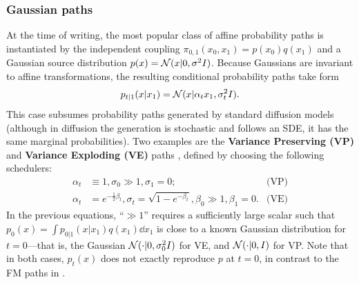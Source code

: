 \documentclass{fairmeta}
\newcommand{\highlight}[1]{{\color{metablue} \textbf{#1}}}
\renewcommand{\eqref}[1]{\labelcref{#1}}
\numberwithin{equation}{section}
\begin{document}
\subsubsection{Gaussian paths} 
\label{subsubsec:gaussian_paths}
At the time of writing, the most popular class of affine probability paths is instantiated by the independent coupling $\pi_{0,1}(x_0,x_1)=p(x_0)q(x_1)$ and a Gaussian source distribution $p(x) = {\mathcal{N}}(x|0, \sigma^2 I)$.
Because Gaussians are invariant to affine transformations, the resulting conditional probability paths take form 
\begin{equation}\label{e:p_t_kernel_gaussian}
    p_{t|1}(x|x_1) = {\mathcal{N}}(x \vert \alpha_t x_1, \sigma_t^2 I).
\end{equation}
This case subsumes probability paths generated by standard diffusion models (although in diffusion the generation is stochastic and follows an SDE, it has the same marginal probabilities).
Two examples are the \highlight{Variance Preserving (VP)} and \highlight{Variance Exploding (VE)} paths \citep{song2021sde}, defined by choosing the following schedulers: 
\begin{align*}
  \alpha_t &\equiv 1, \sigma_0\gg 1, \sigma_1=0; & \text{(VP)}\\ %
  \alpha_t &= e^{-\frac{1}{2}\beta_t}, \sigma_t = \sqrt{1-e^{-\beta_t}}, \beta_0\gg 1, \beta_1=0. & \text{(VE)} %
\end{align*}
In the previous equations, ``$\gg 1$'' requires a sufficiently large scalar such that $p_0(x)=\int p_{0|1}(x|x_1)q(x_1)\dd x_1$ is close to a known Gaussian distribution for $t=0$---that is, the Gaussian ${\mathcal{N}}(\cdot|0,\sigma_0^2 I)$ for VE, and ${\mathcal{N}}(\cdot|0,I)$ for VP.
Note that in both cases, $p_t(x)$ does not exactly reproduce $p$ at $t=0$, in contrast to the FM paths in \eqref{e:scheduler}.
\end{document}
